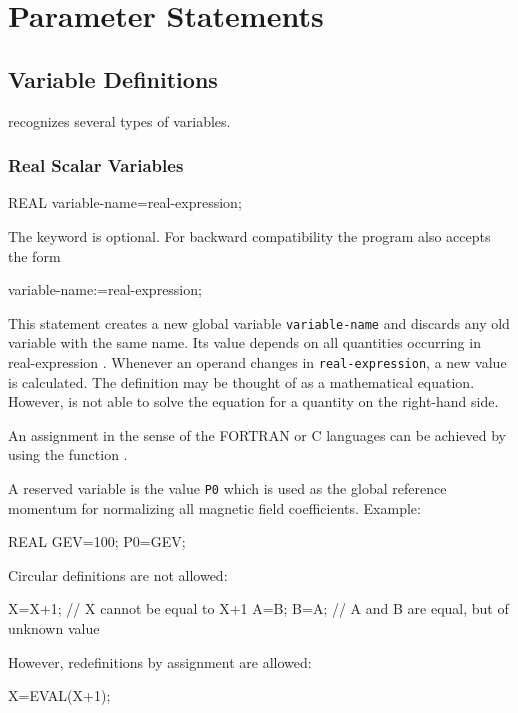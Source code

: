 \section{Parameter Statements}
\label{sec:parameter}

\subsection{Variable Definitions}
\label{sec:variable}
\opal recognizes several types of variables.

\subsubsection{Real Scalar Variables}
\begin{example}
REAL variable-name=real-expression;
\end{example}
The keyword  is optional.
For backward compatibility the program also accepts the form
\begin{example}
variable-name:=real-expression;
\end{example}
This statement creates a new global variable \texttt{variable-name}
and discards any old variable with the same name.
Its value depends on all quantities occurring
in {real-expression} .
Whenever an operand changes in \texttt{real-expression},
a new value is calculated.
The definition may be thought of as a mathematical equation.
However, \opal is not able to solve the equation for a quantity on the
right-hand side.

An assignment in the sense of the FORTRAN or C languages can be achieved
by using the  function .

A reserved variable is the value \texttt{P0} which is used as the
global reference momentum for normalizing all magnetic field coefficients.
\noindent Example:
\begin{example}
REAL GEV=100;
P0=GEV;
\end{example}
Circular definitions are not allowed:
\begin{example}
X=X+1;    // X cannot be equal to X+1
A=B;
B=A;      // A and B are equal, but of unknown value
\end{example}
However, redefinitions by assignment are allowed:
\begin{example}
X=EVAL(X+1);
\end{example}

